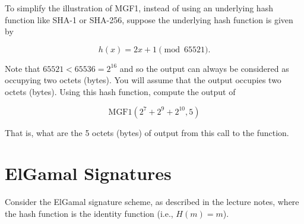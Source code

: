 \documentclass[12pt, letterpaper]{article}
\begin{document}
\medskip
To simplify the illustration of MGF1, instead of using an underlying hash function like SHA-1 or SHA-256, suppose the underlying hash function is given by

\[ h(x) = 2x + 1  \pmod {65521}. \] 

Note that $65521 < 65536 = 2^{16}$ and so the output can always be considered as occupying two octets (bytes). You will assume that the output occupies two octets (bytes). Using this hash function, compute the output of 

\[  \textrm{MGF1}(2^7+2^9+2^{10}, 5) \]

That is, what are the 5 octets (bytes) of output from this call to the function. 

\section{ElGamal Signatures}

Consider the ElGamal signature scheme, as described in the 
lecture notes, where the hash function is the identity 
function (i.e., $H(m) = m$).
\end{document}
